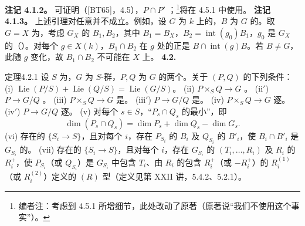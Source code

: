 \textbf{注记 4.1.2。} 可证明（[BT65]，4.5），$P\cap P'$ ；\footnote{编者注：考虑到 4.5.1 所增细节，此处改动了原著（原著说“我们不使用这个事实”）。}将在 4.5.1 中使用。
\textbf{注记 4.1.3。} 上述引理对任意并不成立。例如，设 $G$ 为 $k$ 上的，$B$ 为 $G$ 的。取 $G=X$ 为，考虑 $G_X$ 的 $B_1,B_2$，其中 $B_1=B_X$，$B_2=\operatorname{int}(g_0)B_1$，$g_0$ 是 $G_X$ 的（）。对每个 $g\in X(k)$，$B_1\cap B_2$ 在 $g$ 处的正是 $B\cap\operatorname{int}(g)B$。若 $B\ne G$，此随 $g$ 变化，故 $B_1\cap B_2$ 不可能在 $X$ 上。
\textbf{4.2. }
\begin{SGAresult}{定理}{4.2.1}
设 $S$ 为，$G$ 为 $S$-群，$P,Q$ 为 $G$ 的两个。关于 $(P,Q)$ 的下列条件：
(i) $\operatorname{Lie}(P/S)+\operatorname{Lie}(Q/S)=\operatorname{Lie}(G/S)$。
(ii)  $P\times_SQ\to G$ 。
(ii$'$)  $P\to G/Q$ 。
(iii)  $P\times_SQ\to G$ 是。
(iii$'$)  $P\to G/Q$ 是。
(iv)  $P\times_SQ\to G$ 逐。
(iv$'$)  $P\to G/Q$ 逐。
(v) 对每个 $s\in S$，“$P_s\cap Q_s$ 的最小”，即
\[\dim(P_s\cap Q_s)=\dim P_s+\dim Q_s-\dim G_s.\]
(vi) 存在的 $\{S_i\to S\}$，且对每个 $i$，存在 $P_{S_i}$ 的 $B_i$ 及 $Q_{S_i}$ 的 $B'_i$，使 $B_i\cap B'_i$ 是 $G_{S_i}$ 的。
(vii) 存在的 $\{S_i\to S\}$，且对每个 $i$，存在 $G_{S_i}$ 的 $(T_i,\ldots,R_i)$ 及 $R_i$ 的 $R_i^+$，使 $P_{S_i}$（或 $Q_{S_i}$）是 $G_{S_i}$ 中包含 $T_i$、由 $R_i$ 的包含 $R_i^+$（或 $-R_i^+$）的 $R_i^{(1)}$（或 $R_i^{(2)}$）定义的 $(R)$ 型（定义见第 XXII 讲，5.4.2、5.2.1）。
\end{SGAresult}
